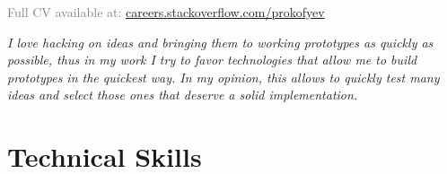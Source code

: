 \documentclass[11pt,a4paper]{moderncv}
\begin{document}
\textcolor{grey}{Full CV available at: \href{http://careers.stackoverflow.com/prokofyev}{careers.stackoverflow.com/prokofyev}}\\
\maketitle

{\Large\textit{I love hacking on ideas and bringing them to working prototypes as quickly as possible, thus in my work I try to favor technologies that allow me to build prototypes in the quickest way. In my opinion, this allows to quickly test many ideas and select those ones that deserve a solid implementation.}}
\vspace{0.5cm}

\section{Technical Skills}

\end{document}
